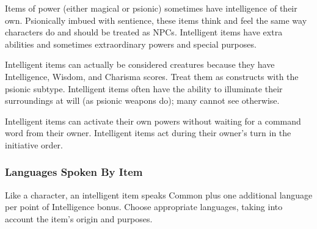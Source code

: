 Items of power (either magical or psionic) sometimes have intelligence of their own. Psionically imbued with sentience, these items think and feel the same way characters do and should be treated as NPCs. Intelligent items have extra abilities and sometimes extraordinary powers and special purposes.

Intelligent items can actually be considered creatures because they have Intelligence, Wisdom, and Charisma scores. Treat them as constructs with the psionic subtype. Intelligent items often have the ability to illuminate their surroundings at will (as psionic weapons do); many cannot see otherwise.

Intelligent items can activate their own powers without waiting for a command word from their owner. Intelligent items act during their owner's turn in the initiative order.



\subsubsection{Languages Spoken By Item}
Like a character, an intelligent item speaks Common plus one additional language per point of Intelligence bonus. Choose appropriate languages, taking into account the item's origin and purposes.










